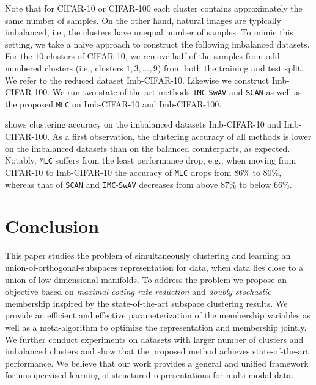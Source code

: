 \documentclass[10pt,twocolumn,letterpaper]{article}
\newcommand{\ours}{MLC}
\newcommand{\mours}{\texttt{\ours}}
\begin{document}
   
   
         Note that for CIFAR-10 or CIFAR-100 each cluster contains approximately the same number of samples. On the other hand, natural images are typically imbalanced, i.e., the clusters have unequal number of samples. To mimic this setting, we take a naive approach to construct the following imbalanced datasets. For the $10$ clusters of CIFAR-10, we remove half of the samples from odd-numbered clusters (i.e., clusters $1,3,\dots,9$) from both the training and test split. We refer to the reduced dataset Imb-CIFAR-10. Likewise we construct Imb-CIFAR-100. We run two state-of-the-art methods \texttt{IMC}-\texttt{SwAV} and \texttt{SCAN} as well as the proposed \mours{} on Imb-CIFAR-10 and Imb-CIFAR-100. 
   
   
    shows clustering accuracy on the imbalanced datasets Imb-CIFAR-10 and Imb-CIFAR-100. As a first observation, the clustering accuracy of all methods is lower on the imbalanced datasets than on the balanced counterparts, as expected. Notably, \mours{} suffers from the least performance drop, e.g., when moving from CIFAR-10 to Imb-CIFAR-10 the accuracy of \mours{} drops from $86\%$ to $80\%$, whereas that of \texttt{SCAN} and \texttt{IMC}-\texttt{SwAV} decreases from above $87\%$ to below $66\%$.
   
   
   
   
   
   
   
   
   

   




   \section{Conclusion}
   This paper studies the problem of simultaneously clustering and learning an union-of-orthogonal-subspaces representation for data, when data lies close to a union of low-dimensional manifolds. To address the problem we propose an objective based on {\em maximal coding rate reduction} and {\em doubly stochastic} membership inspired by the state-of-the-art subspace clustering results. We provide an efficient and effective  parameterization of the membership variables as well as a meta-algorithm to optimize the representation and membership jointly. We further conduct experiments on datasets with larger number of clusters and imbalanced clusters and show that the proposed method achieves state-of-the-art performance. We believe that our work provides a general and unified framework for unsupervised learning of structured representations for multi-modal data.
\end{document}
